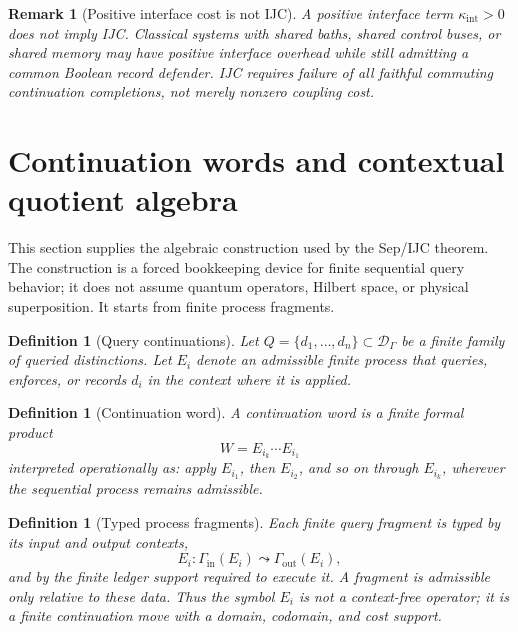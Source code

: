 \documentclass[11pt]{article}
\newtheorem{definition}[theorem]{Definition}
\newtheorem{remark}[theorem]{Remark}
\begin{document}
\begin{remark}[Positive interface cost is not IJC]
A positive interface term $\kappa_{\mathrm{int}}>0$ does not imply IJC.  Classical systems with shared baths, shared control buses, or shared memory may have positive interface overhead while still admitting a common Boolean record defender.  IJC requires failure of all faithful commuting continuation completions, not merely nonzero coupling cost.
\end{remark}

\section{Continuation words and contextual quotient algebra}\label{sec:continuation-word-algebra}

This section supplies the algebraic construction used by the Sep/IJC theorem.  The construction is a forced bookkeeping device for finite sequential query behavior; it does not assume quantum operators, Hilbert space, or physical superposition.  It starts from finite process fragments.

\begin{definition}[Query continuations]
Let $Q=\{d_1,\ldots,d_n\}\subset\mathcal D_\Gamma$ be a finite family of queried distinctions.  Let $E_i$ denote an admissible finite process that queries, enforces, or records $d_i$ in the context where it is applied.
\end{definition}

\begin{definition}[Continuation word]
A continuation word is a finite formal product
\[
 W=E_{i_k}\cdots E_{i_1}
\]
interpreted operationally as: apply $E_{i_1}$, then $E_{i_2}$, and so on through $E_{i_k}$, wherever the sequential process remains admissible.
\end{definition}

\begin{definition}[Typed process fragments]\label{def:typed-process-fragments}
Each finite query fragment is typed by its input and output contexts,
\[
  E_i:\Gamma_{\mathrm{in}}(E_i)\leadsto \Gamma_{\mathrm{out}}(E_i),
\]
and by the finite ledger support required to execute it.  A fragment is admissible only relative to these data.  Thus the symbol $E_i$ is not a context-free operator; it is a finite continuation move with a domain, codomain, and cost support.
\end{definition}
\end{document}
